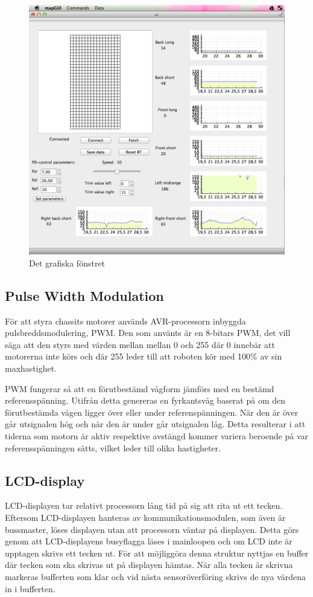 \documentclass[a4paper,12pt,fleqn]{article}
\begin{document}
\begin{figure}[htp] %
  \begin{center}
  \includegraphics[keepaspectratio=true,width=0.5\linewidth]{gui.png}  %
  \end{center}
  \caption{Det grafiska fönstret} %
  \label{fig:gui}
\end{figure}

\subsection{Pulse Width Modulation}

För att styra chassits motorer används AVR-processorn inbyggda pulsbreddsmodulering, PWM. Den som använts är en 8-bitars PWM, det vill säga att den styrs med värden mellan mellan 0 och 255 där 0 innebär att motorerna inte körs och där 255 leder till att roboten kör med 100\% av sin maxhastighet.

PWM fungerar så att en förutbestämd vågform jämförs med en bestämd referensspänning. Utifrån detta genereras en fyrkantsvåg baserat på om den förutbestämda vågen ligger över eller under referenspänningen. När den är över går utsignalen hög och när den är under går utsignalen låg. Detta resulterar i att tiderna som motorn är aktiv respektive avstängd kommer variera beroende på var referensspänningen sätts, vilket leder till olika hastigheter.


\subsection{LCD-display}
LCD-displayen tar relativt processorn lång tid på sig att rita ut ett tecken. Eftersom LCD-displayen hanteras av kommunikationsmodulen, som även är bussmaster, löses displayen utan att processorn väntar på displayen. Detta görs genom att LCD-displayens busyflagga läses i mainloopen och om LCD inte är upptagen skrivs ett tecken ut. För att möjliggöra denna struktur nyttjas en buffer där tecken som ska skrivas ut på displayen hämtas. När alla tecken är skrivna markeras bufferten som klar och vid nästa sensoröverföring skrivs de nya värdena in i bufferten. 
\end{document}
